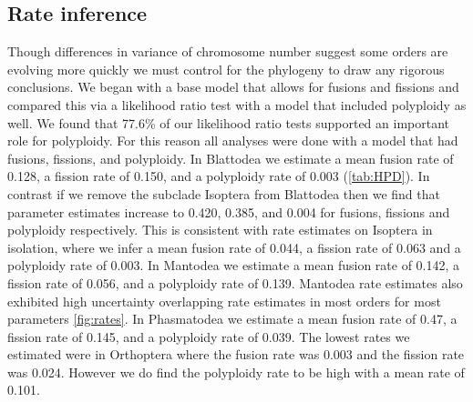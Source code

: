 \subsection{Rate inference}
Though differences in variance of chromosome number suggest some orders are evolving more quickly we must control for the phylogeny to draw any rigorous conclusions.
We began with a base model that allows for fusions and fissions and compared this via a likelihood ratio test with a model that included polyploidy as well.
We found that 77.6\% of our likelihood ratio tests supported an important role for polyploidy.
For this reason all analyses were done with a model that had fusions, fissions, and polyploidy.
In Blattodea we estimate a mean fusion rate of 0.128, a fission rate of 0.150, and a polyploidy rate of 0.003 (\cref{tab:HPD}).
In contrast if we remove the subclade Isoptera from Blattodea then we find that parameter estimates increase to 0.420, 0.385, and 0.004 for fusions, fissions and polyploidy respectively.
This is consistent with rate estimates on Isoptera in isolation, where we infer a mean fusion rate of 0.044, a fission rate of 0.063 and a polyploidy rate of 0.003.
In Mantodea we estimate a mean fusion rate of 0.142, a fission rate of 0.056, and a polyploidy rate of 0.139.
Mantodea rate estimates also exhibited high uncertainty overlapping rate estimates in most orders for most parameters \cref{fig:rates}.
In Phasmatodea we estimate a mean fusion rate of 0.47, a fission rate of 0.145, and a polyploidy rate of 0.039.
The lowest rates we estimated were in Orthoptera where the fusion rate was 0.003 and the fission rate was 0.024. However we do find the polyploidy rate to be high with a mean rate of 0.101.

